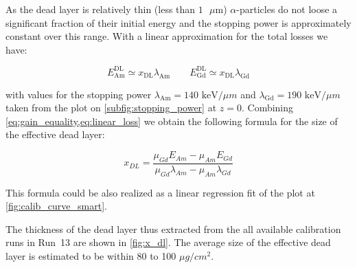 \documentclass[a4paper,12pt]{article}
\begin{document}
As the dead layer is relatively thin (less than $1\text{ }\mu\text{m}$)
$\alpha$-particles do not loose a significant fraction of their initial energy
and the stopping power is approximately constant over this range. With a linear
approximation for the total losses we have:

\begin{equation}
E^\text{DL}_\text{Am} \simeq x_\text{DL} \lambda_\text{Am} \qquad
E^\text{DL}_\text{Gd} \simeq x_\text{DL} \lambda_\text{Gd}
\label{eq:linear_loss}
\end{equation}

\noindent
with values for the stopping power $\lambda_\text{Am} = 140\text{ keV/}\mu m$
and $\lambda_\text{Gd} = 190\text{ keV/}\mu m$ taken from the plot on
\cref{subfig:stopping_power} at $z=0$. Combining \cref{eq:gain_equality,eq:linear_loss}
we obtain the following formula for the size of the effective dead layer:

\begin{equation}
x_{DL} = \frac{\mu_{Gd} E_{Am} - \mu_{Am} E_{Gd}}{\mu_{Gd}\lambda_{Am} - \mu_{Am}\lambda_{Gd}}
\label{eq:x_dl}
\end{equation}

This formula could be also realized as a linear regression fit of the plot at
\cref{fig:calib_curve_smart}.

The thickness of the dead layer thus extracted from the all available
calibration runs in Run~13 are shown in \cref{fig:x_dl}. The average size
of the effective dead layer is estimated to be within 80 to 100 $\mu g/cm^2$.
\end{document}
